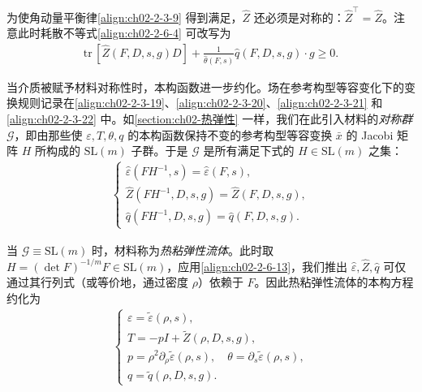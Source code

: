 \documentclass[../../main.tex]{subfiles}
\begin{document}
为使角动量平衡律\eqref{align:ch02-2-3-9} 得到满足，$\hat{Z}$ 还必须是对称的：$\hat{Z}^{\top}=\hat{Z}$。注意此时耗散不等式\eqref{align:ch02-2-6-4} 可改写为
\begin{align}
\mathrm{tr}\,[\hat{Z}(F,D,s,g)D]+\frac{1}{\hat{\theta}(F,s)}\hat{q}(F,D,s,g)\cdot g\geqslant 0.
\label{align:ch02-2-6-12}
\end{align}

当介质被赋予材料对称性时，本构函数进一步约化。场在参考构型等容变化下的变换规则记录在\eqref{align:ch02-2-3-19}、\eqref{align:ch02-2-3-20}、\eqref{align:ch02-2-3-21} 和 \eqref{align:ch02-2-3-22} 中。如\cref{section:ch02-热弹性} 一样，我们在此引入材料的\emph{对称群} $\mathscr{G}$，即由那些使 $\varepsilon,T,\theta,q$ 的本构函数保持不变的参考构型等容变换 $\bar{x}$ 的 Jacobi 矩阵 $H$ 所构成的 $\mathrm{SL}(m)$ 子群。于是 $\mathscr{G}$ 是所有满足下式的 $H\in\mathrm{SL}(m)$ 之集：
\begin{align}
\begin{cases}
\hat{\varepsilon}(FH^{-1},s)=\hat{\varepsilon}(F,s),\\
\hat{Z}(FH^{-1},D,s,g)=\hat{Z}(F,D,s,g),\\
\hat{q}(FH^{-1},D,s,g)=\hat{q}(F,D,s,g).
\end{cases}
\label{align:ch02-2-6-13}
\end{align}

当 $\mathscr{G}\equiv\mathrm{SL}(m)$ 时，材料称为\emph{热粘弹性流体}。此时取 $H=(\det F)^{-1/m}F\in\mathrm{SL}(m)$，应用\eqref{align:ch02-2-6-13}，我们推出 $\hat{\varepsilon},\hat{Z},\hat{q}$ 可仅通过其行列式（或等价地，通过密度 $\rho$）依赖于 $F$。因此热粘弹性流体的本构方程约化为
\begin{align}
\begin{cases}
\varepsilon=\tilde{\varepsilon}(\rho,s),\\
T=-pI+\tilde{Z}(\rho,D,s,g),\\
p=\rho^{2}\partial_{\rho}\tilde{\varepsilon}(\rho,s),\quad\theta=\partial_{s}\tilde{\varepsilon}(\rho,s),\\
q=\tilde{q}(\rho,D,s,g).
\end{cases}
\label{align:ch02-2-6-14}
\end{align}
\end{document}
